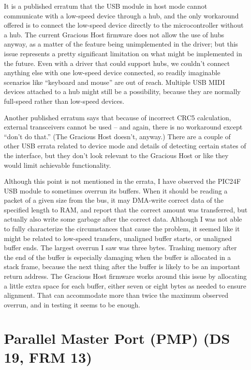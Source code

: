 It is a published erratum that the USB module in host mode cannot
communicate with a low-speed device through a hub, and the only workaround
offered is to connect the low-speed device directly to the microcontroller
without a hub.  The current Gracious Host firmware does not allow the use of
hubs anyway, as a matter of the feature being unimplemented in the driver;
but this issue represents a pretty significant limitation on what might be
implemented in the future.  Even with a driver that could support hubs, we
couldn't connect anything else with one low-speed device connected, so
readily imaginable scenarios like ``keyboard and mouse'' are out of reach. 
Multiple USB MIDI devices attached to a hub might still be a possibility,
because they are normally full-speed rather than low-speed devices.

Another published erratum says that because of incorrect CRC5 calculation,
external transceivers cannot be used -- and again, there is no workaround
except ``don't do that.''  (The Gracious Host doesn't, anyway.)  There are a
couple of other USB errata related to device mode and details of detecting
certain states of the interface, but they don't look relevant to the
Gracious Host or like they would limit achievable functionality.

Although this point is not mentioned in the errata, I have observed the
PIC24F USB module to sometimes overrun its buffers.  When it should be
reading a packet of a given size from the bus, it may DMA-write correct data
of the specified length to RAM, and report that the correct amount was
transferred, but actually also write some garbage after the correct data. 
Although I was not able to fully characterize the circumstances that cause
the problem, it seemed like it might be related to low-speed transfers,
unaligned buffer starts, or unaligned buffer ends.  The largest overrun I
saw was three bytes.  Trashing memory after the end of the buffer is
especially damaging when the buffer is allocated in a stack frame, because
the next thing after the buffer is likely to be an important return address. 
The Gracious Host firmware works around this issue by allocating a little
extra space for each buffer, either seven or eight bytes as needed to ensure
alignment.  That can accommodate more than twice the maximum observed
overrun, and in testing it seems to be enough.


\section{Parallel Master Port (PMP) (DS 19, FRM 13)}

